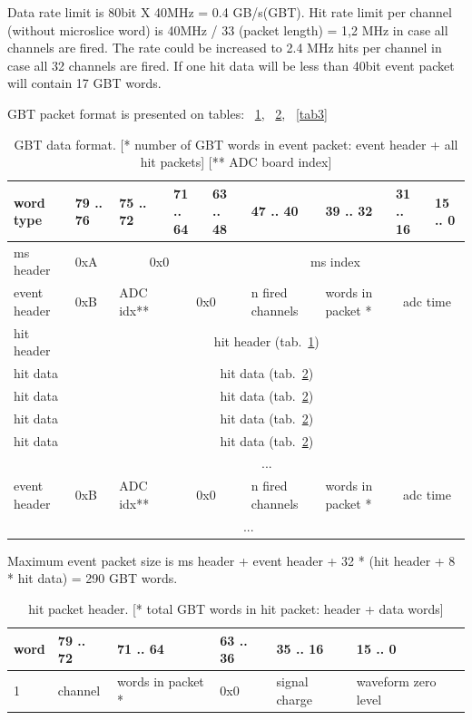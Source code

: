 \documentclass{article}
\begin{document}
Data rate limit is 80bit X 40MHz = 0.4 GB/s(GBT). Hit rate limit per channel (without microslice word) is 40MHz / 33 (packet length) = 1,2 MHz in case all channels are fired. The rate could be increased to  2.4 MHz hits per channel in case all 32 channels are fired. If one hit data will be less than 40bit event packet will contain 17 GBT words.

GBT packet format is presented on tables: ~\ref{tab1}, ~\ref{tab2}, ~\ref{tab3}

\begin{table}[H]
\centering
\begin{tabular}{| l | l | l | l | l | l | l | l | l |}
\hline
word type & 79 .. 76 & 75 .. 72 & 71 .. 64 & 63 .. 48 & 47 .. 40 & 39 .. 32 & 31 .. 16 & 15 .. 0 \\ \hline
ms header & 0xA & \multicolumn{2}{c|}{0x0}  & \multicolumn{5}{c|}{ms index} \\ \hline
event header & 0xB & ADC idx** & \multicolumn{2}{c|}{0x0} & n fired channels & words in packet * & \multicolumn{2}{c|}{adc time} \\ \hline
hit header & \multicolumn{8}{c|}{hit header (tab.~\ref{tab1})} \\ \hline
hit data & \multicolumn{8}{c|}{hit data (tab.~\ref{tab2})} \\ \hline
hit data & \multicolumn{8}{c|}{hit data (tab.~\ref{tab2})} \\ \hline
hit data & \multicolumn{8}{c|}{hit data (tab.~\ref{tab2})} \\ \hline
hit data & \multicolumn{8}{c|}{hit data (tab.~\ref{tab2})} \\ \hline
  & \multicolumn{8}{c|}{ ... } \\ \hline

event header & 0xB & ADC idx** & \multicolumn{2}{c|}{0x0} & n fired channels & words in packet * & \multicolumn{2}{c|}{adc time} \\ \hline
  & \multicolumn{7}{c|}{ ... } \\ \hline

\end{tabular}
\caption{GBT data format. [* number of GBT words in event packet: event header + all hit packets] [** ADC board index] \label{tab1}}
\end{table}

Maximum event packet size is ms header + event header + 32 * (hit header + 8 * hit data) = 290 GBT words.

\begin{table}[H]
\centering
\begin{tabular}{| l | l | l | l | l | l |}
\hline
word & 79 .. 72 & 71 .. 64 & 63 .. 36 & 35 .. 16 & 15 .. 0 \\ \hline
1 & channel &words in packet *& 0x0 & signal charge & waveform zero level \\ \hline
\end{tabular}
\caption{hit packet header. [* total GBT words in hit packet: header + data words]\label{tab2}}
\end{table}
\end{document}
